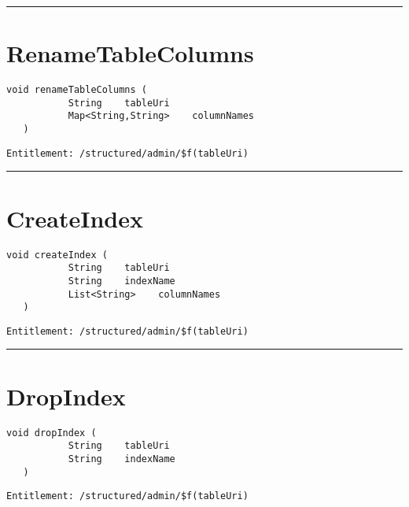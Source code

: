 \rule{12cm}{2pt}
\section{RenameTableColumns}
\label{Api:RenameTableColumns}
\begin{lstlisting}[style=nonumbers]
   void renameTableColumns (
           String    tableUri
           Map<String,String>    columnNames
   )
\end{lstlisting}
\begin{Verbatim}[formatcom=\color{Maroon}]
  Entitlement: /structured/admin/$f(tableUri)
\end{Verbatim}



\rule{12cm}{2pt}
\section{CreateIndex}
\label{Api:CreateIndex}
\begin{lstlisting}[style=nonumbers]
   void createIndex (
           String    tableUri
           String    indexName
           List<String>    columnNames
   )
\end{lstlisting}
\begin{Verbatim}[formatcom=\color{Maroon}]
  Entitlement: /structured/admin/$f(tableUri)
\end{Verbatim}



\rule{12cm}{2pt}
\section{DropIndex}
\label{Api:DropIndex}
\begin{lstlisting}[style=nonumbers]
   void dropIndex (
           String    tableUri
           String    indexName
   )
\end{lstlisting}
\begin{Verbatim}[formatcom=\color{Maroon}]
  Entitlement: /structured/admin/$f(tableUri)
\end{Verbatim}



